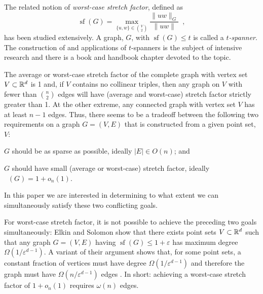\documentclass{patmorin}
\DeclareMathOperator{\xsf}{(a)sf}
\DeclareMathOperator{\strf}{sf}
\newcommand{\eps}{\varepsilon}
\begin{document}
The related notion of \emph{worst-case
stretch factor}, defined as
\[
    \strf(G) = \max_{\{u,w\}\in\binom{V}{2}}\frac{\|uw\|_G}{\|uw\|}  \enspace ,
\]
has been studied extensively.  A graph, $G$, with $\strf(G)\le t$ is
called a \emph{$t$-spanner}.  The construction of and applications
of $t$-spanners is the subject of intensive research and there
is a book \cite{narasimhan.smid:geometric} and handbook chapter
\cite{eppstein:spanning} devoted to the topic.

The average or worst-case stretch factor of the complete graph
with vertex set $V\subset\mathbb{R}^d$ is 1 and, if $V$ contains no
collinear triples, then any graph on $V$ with fewer than $\binom{n}{2}$
edges will have (average and worst-case) stretch factor strictly greater
than 1.  At the other extreme, any connected graph with vertex set $V$
has at least $n-1$ edges.  Thus, there seems to be a tradeoff between
the following two requirements on a graph $G=(V,E)$ that is constructed
from a given point set, $V$:
\begin{compactenum}
  \item $G$ should be as sparse as possible, ideally $|E|\in O(n)$; and

  \item $G$ should have small (average or worst-case) stretch factor,
  ideally $\xsf(G)=1+o_n(1)$.
\end{compactenum}
In this paper we are interested in determining to what extent we can
simultaneously satisfy these two conflicting goals.

For worst-case stretch factor, it is not possible to achieve the preceding
two goals simultaneously: Elkin and Solomon \cite{elkin.solomon:steiner}
show that there exists point sets $V\subset\mathbb{R}^d$ such that any
graph $G=(V,E)$ having $\strf(G)\le 1+\eps$ has maximum degree
$\Omega(1/\eps^{d-1})$.  A variant of their argument shows that,
for some point sets, a constant fraction of vertices must have
degree $\Omega(1/\eps^{d-1})$ and therefore the graph must have
$\Omega(n/\eps^{d-1})$ edges \cite{solomon}. In short: achieving a
worst-case stretch factor of $1+o_n(1)$ requires $\omega(n)$ edges.

\end{document}
